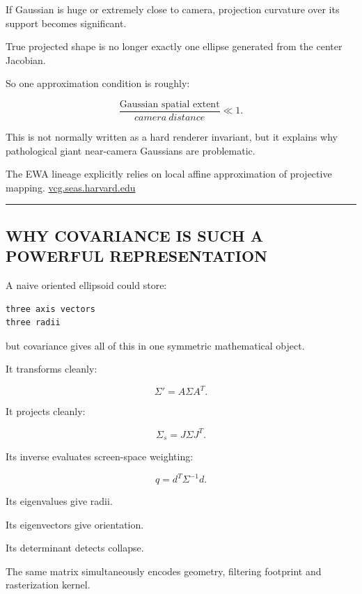 If Gaussian is huge or extremely close to camera, projection curvature over its support becomes significant.

True projected shape is no longer exactly one ellipse generated from the center Jacobian.

So one approximation condition is roughly:

\[
\boxed{
\frac{
\text{Gaussian spatial extent}
}{
camera\ distance
}
\ll1.
}
\]

This is not normally written as a hard renderer invariant, but it explains why pathological giant near-camera Gaussians are problematic.

The EWA lineage explicitly relies on local affine approximation of projective mapping. \href{https://vcg.seas.harvard.edu/content/3-publications/20020101-ewa-splatting/zwicker_ewa.pdf?utm_source=chatgpt.com}{vcg.seas.harvard.edu}

\begin{center}\rule{0.5\linewidth}{0.5pt}\end{center}

\subsection{WHY COVARIANCE IS SUCH A POWERFUL REPRESENTATION}\label{04-visual-computing-ii-ch038-why-covariance-is-such-a-powerful-representation}

A naive oriented ellipsoid could store:

\protect{}\label{nmuml2}%
\begin{verbatim}
three axis vectors
three radii
\end{verbatim}

but covariance gives all of this in one symmetric mathematical object.

It transforms cleanly:

\[
\Sigma'
=
A\Sigma A^T.
\]

It projects cleanly:

\[
\Sigma_s=
J\Sigma J^T.
\]

Its inverse evaluates screen-space weighting:

\[
q=
d^T\Sigma^{-1}d.
\]

Its eigenvalues give radii.

Its eigenvectors give orientation.

Its determinant detects collapse.

The same matrix simultaneously encodes geometry, filtering footprint and rasterization kernel.

